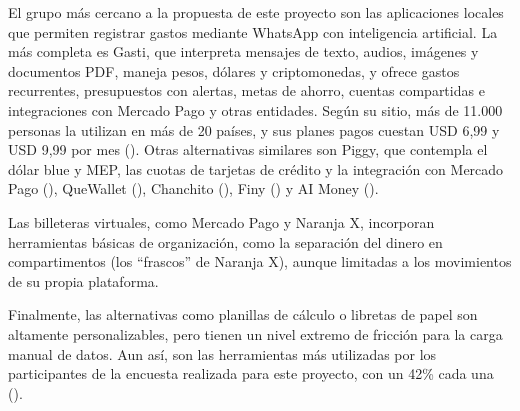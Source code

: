 El grupo más cercano a la propuesta de este proyecto son las
aplicaciones locales que permiten registrar gastos mediante WhatsApp con
inteligencia artificial. La más completa es Gasti, que interpreta
mensajes de texto, audios, imágenes y documentos PDF, maneja pesos,
dólares y criptomonedas, y ofrece gastos recurrentes, presupuestos con
alertas, metas de ahorro, cuentas compartidas e integraciones con
Mercado Pago y otras entidades. Según su sitio, más de 11.000 personas
la utilizan en más de 20 países, y sus planes pagos cuestan USD 6,99 y
USD 9,99 por mes (). Otras
alternativas similares son Piggy, que contempla el dólar blue y MEP, las
cuotas de tarjetas de crédito y la integración con Mercado Pago
(), QueWallet
(), Chanchito
(), Finy
() y AI Money
().

Las billeteras virtuales, como Mercado Pago y Naranja X, incorporan
herramientas básicas de organización, como la separación del dinero en
compartimentos (los ``frascos'' de Naranja X), aunque limitadas a los
movimientos de su propia plataforma.

Finalmente, las alternativas como planillas de cálculo o libretas de
papel son altamente personalizables, pero tienen un nivel extremo de
fricción para la carga manual de datos. Aun así, son las herramientas
más utilizadas por los participantes de la encuesta realizada para este
proyecto, con un 42\% cada una
().

